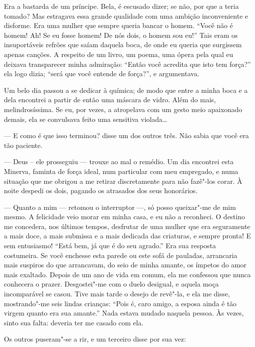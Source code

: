 Era a bastarda de um príncipe. Bela, é escusado dizer; se
não, por que a teria tomado? Mas estragava essa grande qualidade
com uma ambição inconveniente e disforme. Era uma mulher que sempre
queria bancar o homem. “Você não é homem! Ah! Se eu
fosse homem! De nós dois, o homem sou eu!'' Tais eram os
insuportáveis refrões que saíam daquela boca, de onde eu queria que surgissem apenas canções. A respeito de um livro, um poema, uma
ópera pela qual eu deixava transparecer minha admiração:
“Então você acredita que isto tem força?'' ela logo dizia; “será que você
entende de força?'', e argumentava.

Um belo dia passou a se dedicar à química; de modo que
entre a minha boca e a dela encontrei a partir de então uma máscara de vidro.
Além do mais, melindrosíssima. Se eu, por vezes, a atropelava com um
gesto meio apaixonado demais, ela se convulsava feito uma sensitiva
violada\ldots\ 

--- E como é que isso terminou? disse um dos outros três. Não sabia que
você era tão paciente.

--- Deus – ele prosseguiu --- trouxe ao mal o remédio. Um dia encontrei esta
Minerva, faminta de força ideal, num particular com meu empregado, e
numa situação que me obrigou a me retirar discretamente para não
fazê"-los corar. À noite despedi os dois, pagando os atrasados dos seus
honorários.

--- Quanto a mim --- retomou o interruptor ---, só posso queixar"-me de mim
mesmo. A felicidade veio morar em minha casa, e eu não a reconheci. O
destino me concedera, nos últimos tempos, desfrutar de uma
mulher que era seguramente a mais doce, a mais submissa e a mais
dedicada das criaturas, e sempre pronta! E sem entusiasmo!
“Está bem, já que é do seu agrado.'' Era
sua resposta costumeira. Se você enchesse esta parede ou
este sofá de pauladas, arrancaria mais suspiros do que arrancavam, do seio de
minha amante, os ímpetos do amor mais exaltado. Depois de um ano de
vida em comum, ela me confessou que nunca conhecera o prazer.
Desgostei"-me com o duelo desigual, e aquela moça incomparável se
casou. Tive mais tarde o desejo de revê"-la, e ela me disse,
mostrando"-me seis lindas crianças: “Pois é, caro
amigo, a esposa ainda é tão virgem quanto era sua
amante.'' Nada estava mudado naquela pessoa. Às vezes,
sinto sua falta: deveria ter me casado com ela.

Os outros puseram"-se a rir, e um terceiro disse por sua vez:

